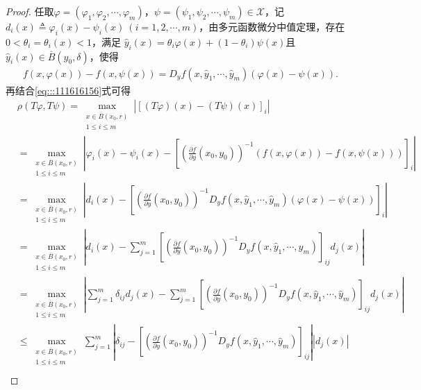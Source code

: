 \documentclass[../../main.tex]{subfiles}%
\begin{document}
\begin{proof}
任取$\varphi = (\varphi_1, \varphi_2, \cdots, \varphi_m)$，$\psi = (\psi_1, \psi_2, \cdots, \psi_m)\in\mathcal{X}$，记$d_i(x) \triangleq \varphi_i(x) - \psi_i(x)\ (i=1,2,\cdots,m)$，由多元函数微分中值定理，存在$0 < \theta_i = \theta_i(x) < 1$，满足
$\hat{y}_i(x) = \theta_i \varphi(x) + (1 - \theta_i) \psi(x)$且$\hat{y}_i(x)\in\overline{B}(y_0,\delta)$，使得
\begin{align*}
f(x,\varphi(x))-f(x,\psi(x))=D_y f(x, \hat{y}_1, \cdots, \hat{y}_m) \left( \varphi(x) - \psi(x) \right).
\end{align*}
再结合\eqref{eq:::111616156}式可得
\begin{align}
&\rho(T\varphi, T\psi) = \max_{\substack{x \in \overline{B}(x_0, r) \\ 1 \leqslant i \leqslant m}} \left| \left[ (T\varphi)(x) - (T\psi)(x) \right]_i \right| \nonumber \\
&= \max_{\substack{x \in \overline{B}(x_0, r) \\ 1 \leqslant i \leqslant m}} \left| \varphi_i(x) - \psi_i(x) - \left[ \left( \frac{\partial f}{\partial y}(x_0, y_0) \right)^{-1} \left( f(x, \varphi(x)) - f(x, \psi(x)) \right) \right]_i \right| \nonumber \\
&= \max_{\substack{x \in \overline{B}(x_0, r) \\ 1 \leqslant i \leqslant m}} \left| d_i(x) - \left[ \left( \frac{\partial f}{\partial y}(x_0, y_0) \right)^{-1} D_y f(x, \hat{y}_1, \cdots, \hat{y}_m) \left( \varphi(x) - \psi(x) \right) \right]_i \right| \nonumber \\
&= \max_{\substack{x \in \overline{B}(x_0, r) \\ 1 \leqslant i \leqslant m}} \left| d_i(x) - \sum_{j=1}^m \left[ \left( \frac{\partial f}{\partial y}(x_0, y_0) \right)^{-1} D_y f(x, \hat{y}_1, \cdots, \hat{y}_m) \right]_{ij} d_j(x) \right| \nonumber \\
&=\max_{\substack{x \in \overline{B}(x_0, r) \\ 1 \leqslant i \leqslant m}}\left| \sum_{j=1}^m{\delta _{ij}d_{j}(x)}-\sum_{j=1}^m{\left[ \left( \frac{\partial f}{\partial y}(x_0,y_0) \right) ^{-1}D_yf(x,\hat{y}_1,\cdots ,\hat{y}_m) \right] _{ij}d_j(x)} \right|
\nonumber \\
&\leqslant \max_{\substack{x \in \overline{B}(x_0, r) \\ 1 \leqslant i \leqslant m}}\sum_{j=1}^m{\left| \delta _{ij}-\left[ \left( \frac{\partial f}{\partial y}(x_0,y_0) \right) ^{-1}D_yf(x,\hat{y}_1,\cdots ,\hat{y}_m) \right] _{ij} \right|\left| d_j(x) \right|}
\nonumber \\

\end{align}
\end{proof}
\end{document}
